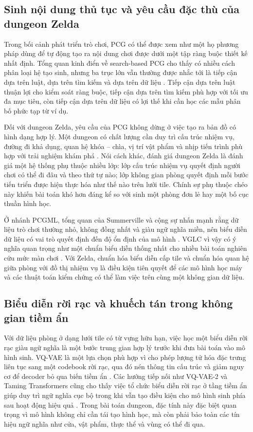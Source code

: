 \documentclass[oneside,a4paper,12pt]{extreport}
\begin{document}
\subsection{Sinh nội dung thủ tục và yêu cầu đặc thù của dungeon Zelda}
Trong bối cảnh phát triển trò chơi, PCG có thể được xem như một họ phương pháp dùng để tự động tạo ra nội dung chơi được dưới một tập ràng buộc thiết kế nhất định. Tổng quan kinh điển về search-based PCG cho thấy có nhiều cách phân loại hệ tạo sinh, nhưng ba trục lớn vẫn thường được nhắc tới là tiếp cận dựa trên luật, dựa trên tìm kiếm và dựa trên dữ liệu \cite{togelius2011pcg,shaker2016pcgbook}. Tiếp cận dựa trên luật thuận lợi cho kiểm soát ràng buộc, tiếp cận dựa trên tìm kiếm phù hợp với tối ưu đa mục tiêu, còn tiếp cận dựa trên dữ liệu có lợi thế khi cần học các mẫu phân bố phức tạp từ ví dụ.

Đối với dungeon Zelda, yêu cầu của PCG không dừng ở việc tạo ra bản đồ có hình dạng hợp lý. Một dungeon có chất lượng cần duy trì cấu trúc nhiệm vụ, đường đi khả dụng, quan hệ khóa -- chìa, vị trí vật phẩm và nhịp tiến trình phù hợp với trải nghiệm khám phá \cite{dormans2011missionspaces,mota2021dungeon}. Nói cách khác, đánh giá dungeon Zelda là đánh giá một hệ thống phụ thuộc nhiều lớp: lớp cấu trúc nhiệm vụ quyết định người chơi có thể đi đâu và theo thứ tự nào; lớp không gian phòng quyết định mỗi bước tiến triển được hiện thực hóa như thế nào trên lưới tile. Chính sự phụ thuộc chéo này khiến bài toán khó hơn đáng kể so với sinh một phòng đơn lẻ hay một bố cục thuần hình học.

Ở nhánh PCGML, tổng quan của Summerville và cộng sự nhấn mạnh rằng dữ liệu trò chơi thường nhỏ, không đồng nhất và giàu ngữ nghĩa miền, nên biểu diễn dữ liệu có vai trò quyết định đến độ ổn định của mô hình \cite{summerville2018pcgml}. VGLC vì vậy có ý nghĩa quan trọng như một chuẩn biểu diễn thống nhất cho nhiều bài toán nghiên cứu mức màn chơi \cite{summerville2016vglc}. Với Zelda, chuẩn hóa biểu diễn cấp tile và chuẩn hóa quan hệ giữa phòng với đồ thị nhiệm vụ là điều kiện tiên quyết để các mô hình học máy và các thuật toán kiểm chứng có thể làm việc trên cùng một không gian dữ liệu.

\subsection{Biểu diễn rời rạc và khuếch tán trong không gian tiềm ẩn}
Với dữ liệu phòng ở dạng lưới tile có từ vựng hữu hạn, việc học một biểu diễn rời rạc giàu ngữ nghĩa là một bước trung gian hợp lý trước khi đưa bài toán vào mô hình sinh. VQ-VAE là một lựa chọn phù hợp vì cho phép lượng tử hóa đặc trưng liên tục sang một codebook rời rạc, qua đó nén thông tin cấu trúc và giảm nguy cơ để decoder bỏ qua biến tiềm ẩn \cite{oord2017vqvae}. Các hướng tiếp nối như VQ-VAE-2 và Taming Transformers cũng cho thấy việc tổ chức biểu diễn rời rạc ở tầng tiềm ẩn giúp duy trì ngữ nghĩa cục bộ trong khi vẫn tạo điều kiện cho mô hình sinh phía sau hoạt động hiệu quả \cite{razavi2019vqvae2,esser2021taming}. Trong bài toán dungeon, đặc tính này đặc biệt quan trọng vì mô hình không chỉ cần tái tạo hình học, mà còn phải bảo toàn các tín hiệu ngữ nghĩa như cửa, vật phẩm, thực thể và vùng có thể đi qua.
\end{document}
